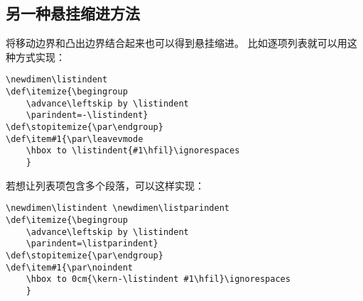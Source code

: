 \documentclass{book}
\begin{document}
\subsection{另一种悬挂缩进方法}

将移动边界和凸出边界结合起来也可以得到悬挂缩进。
比如逐项列表就可以用这种方式实现：
\begin{verbatim}
\newdimen\listindent
\def\itemize{\begingroup
    \advance\leftskip by \listindent
    \parindent=-\listindent}
\def\stopitemize{\par\endgroup}
\def\item#1{\par\leavevmode
    \hbox to \listindent{#1\hfil}\ignorespaces
    }
\end{verbatim}
若想让列表项包含多个段落，可以这样实现：
\begin{verbatim}
\newdimen\listindent \newdimen\listparindent
\def\itemize{\begingroup
    \advance\leftskip by \listindent
    \parindent=\listparindent}
\def\stopitemize{\par\endgroup}
\def\item#1{\par\noindent
    \hbox to 0cm{\kern-\listindent #1\hfil}\ignorespaces
    }
\end{verbatim}
\end{document}
